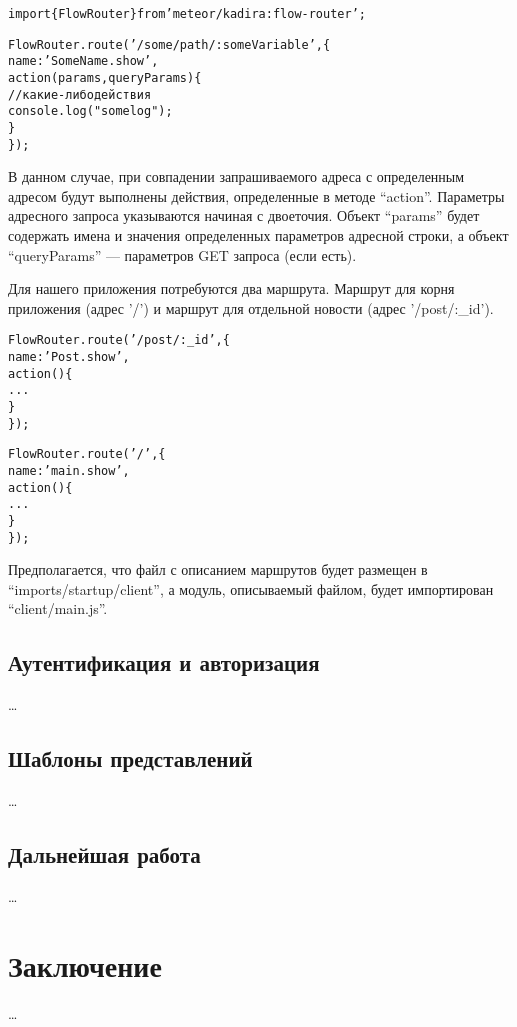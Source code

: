\documentclass[a4paper,12pt]{article}
\begin{document}
\begin{alltt}
import \{ FlowRouter \} from 'meteor/kadira:flow-router';

FlowRouter.route('/some/path/:someVariable', \{
    name: 'SomeName.show',
    action(params, queryParams) \{
        // какие-либо действия
        console.log("some log");
    \}
\});
\end{alltt}

В данном случае, при совпадении запрашиваемого адреса с
определенным адресом будут выполнены действия, определенные
в методе ``action''. Параметры адресного запроса
указываются начиная с двоеточия. Объект ``params''
будет содержать имена и значения определенных параметров 
адресной строки, а объект ``queryParams'' ---
параметров GET запроса (если есть).

Для нашего приложения потребуются два маршрута.
Маршрут для корня приложения (адрес '/') и маршрут
для отдельной новости (адрес '/post/:\_id'). 

\begin{alltt}
FlowRouter.route('/post/:\_id', \{
    name: 'Post.show',
    action() \{  
        ...
    \}
\});

FlowRouter.route('/', \{
    name: 'main.show',
    action() \{  
        ...
    \}
\});
\end{alltt}

Предполагается, что файл с описанием маршрутов будет
размещен в ``imports/startup/client'', а модуль, описываемый
файлом, будет импортирован ``client/main.js''.

\subsection{Аутентификация и авторизация}
\dots

\subsection{Шаблоны представлений}
\dots

\subsection{Дальнейшая работа}
\dots

\section*{Заключение}
\dots

\begin{thebibliography}{99}
	
\end{thebibliography}
\end{document}
